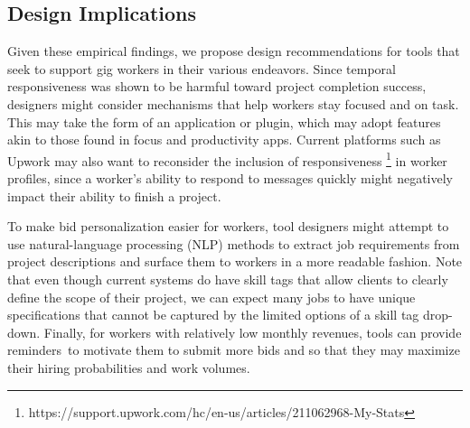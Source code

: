 \subsection{Design Implications}

Given these empirical findings, we propose design recommendations for tools that seek to support gig workers in their various endeavors. Since {temporal responsiveness was shown to be harmful toward project completion success,} designers might consider mechanisms that {help workers stay focused and on task}. This may take the form of an application or plugin, which may adopt features akin to {those found in focus and productivity apps. Current platforms such as Upwork may also want to reconsider the inclusion of responsiveness \footnote{https://support.upwork.com/hc/en-us/articles/211062968-My-Stats} in worker profiles, since a worker's ability to respond to messages quickly might negatively impact their ability to finish a project.}

To make bid personalization easier for workers, tool designers might attempt to use natural-language processing (NLP) methods to extract job requirements from project descriptions and surface them to workers in a more readable fashion. Note that even though current systems do have skill tags that allow clients to clearly define the scope of their project, we can expect many jobs to have unique specifications that cannot be captured by the limited options of a skill tag drop-down. Finally, for workers with relatively low monthly revenues, tools {can} provide reminders\ to motivate them to submit more bids and {so that they may} maximize their hiring probabilities and work volumes.
